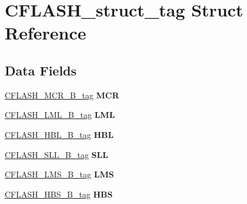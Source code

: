 \hypertarget{structCFLASH__struct__tag}{}\section{C\+F\+L\+A\+S\+H\+\_\+struct\+\_\+tag Struct Reference}
\label{structCFLASH__struct__tag}
\subsection*{Data Fields}
\begin{DoxyCompactItemize}
\item 
\mbox{\label{structCFLASH__struct__tag_a6d387120581ecaef4dff2f05f5a38f57}} 
\mbox{\hyperlink{unionCFLASH__MCR__32B__tag}{C\+F\+L\+A\+S\+H\+\_\+\+M\+C\+R\+\_\+B\+\_\+tag}} {\bfseries M\+CR}
\item 
\mbox{\label{structCFLASH__struct__tag_a394780ed4aed6be06751b57fb52bf502}} 
\mbox{\hyperlink{unionCFLASH__LML__32B__tag}{C\+F\+L\+A\+S\+H\+\_\+\+L\+M\+L\+\_\+B\+\_\+tag}} {\bfseries L\+ML}
\item 
\mbox{\label{structCFLASH__struct__tag_a48d1c29d3ba0361b43193ee3d8553181}} 
\mbox{\hyperlink{unionCFLASH__HBL__32B__tag}{C\+F\+L\+A\+S\+H\+\_\+\+H\+B\+L\+\_\+B\+\_\+tag}} {\bfseries H\+BL}
\item 
\mbox{\label{structCFLASH__struct__tag_a6a98aa8c2a92a4f6867fe7a6e3d9b2bf}} 
\mbox{\hyperlink{unionCFLASH__SLL__32B__tag}{C\+F\+L\+A\+S\+H\+\_\+\+S\+L\+L\+\_\+B\+\_\+tag}} {\bfseries S\+LL}
\item 
\mbox{\label{structCFLASH__struct__tag_adc8d963ffef15c468b27551f66d1193c}} 
\mbox{\hyperlink{unionCFLASH__LMS__32B__tag}{C\+F\+L\+A\+S\+H\+\_\+\+L\+M\+S\+\_\+B\+\_\+tag}} {\bfseries L\+MS}
\item 
\mbox{\label{structCFLASH__struct__tag_a7ebcc19b1cb1b1b9d122baf0617ad86f}} 
\mbox{\hyperlink{unionCFLASH__HBS__32B__tag}{C\+F\+L\+A\+S\+H\+\_\+\+H\+B\+S\+\_\+B\+\_\+tag}} {\bfseries H\+BS}
\item 
\mbox{\label{structCFLASH__struct__tag_ac8a20b544110e2de5b80628026591421}} 

\end{DoxyCompactItemize}
